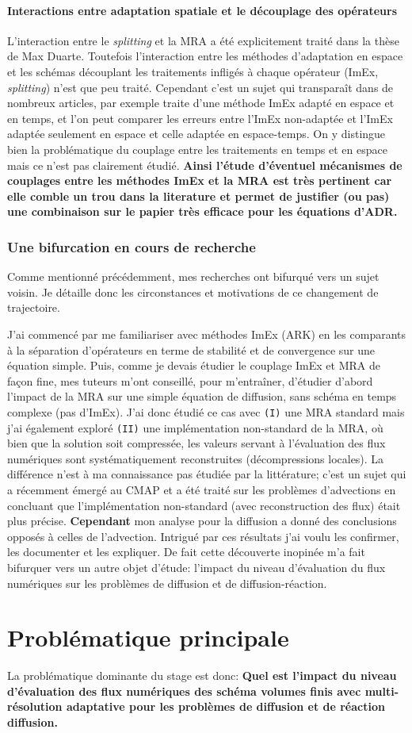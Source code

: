     \paragraph{Interactions entre adaptation spatiale et le découplage des opérateurs}
        L'interaction entre le \textit{splitting} et la MRA a été explicitement traité dans la thèse de Max Duarte.    
        Toutefois l'interaction entre les méthodes d'adaptation en espace et les schémas découplant les traitements infligés à chaque opérateur (ImEx, \textit{splitting}) n'est que peu traité.
        Cependant c'est un sujet qui transparaît dans de nombreux articles, par exemple \cite{Zhang2025IMEXTSA} traite d'une méthode ImEx adapté en espace et en temps, et l'on peut comparer les erreurs entre l'ImEx non-adaptée et 
        l'ImEx adaptée seulement en espace et celle adaptée en espace-temps. On y distingue bien la problématique du couplage entre les traitements en temps et en espace mais ce n'est pas clairement étudié.
        \textbf{Ainsi l'étude d'éventuel mécanismes de couplages entre les méthodes ImEx et la MRA est très pertinent car elle comble un trou dans la literature et permet de justifier (ou pas)
        une combinaison sur le papier très efficace pour les équations d'ADR.}
    \subsubsection{Une bifurcation en cours de recherche}
        Comme mentionné précédemment, mes recherches ont bifurqué vers un sujet voisin. Je détaille donc les circonstances et motivations de ce changement de trajectoire.\par 
        J'ai commencé par me familiariser avec méthodes ImEx (ARK) en les comparants à la séparation d'opérateurs en terme de stabilité et de convergence sur une équation simple.
        Puis, comme je devais étudier le couplage ImEx et MRA de façon fine, mes tuteurs m'ont conseillé, pour m’entraîner, 
        d'étudier d'abord l'impact de la MRA sur une simple équation de diffusion, sans schéma en temps complexe (pas d'ImEx).
        J'ai donc étudié ce cas avec \texttt{(I)} une MRA standard mais j'ai également exploré \texttt{(II)} une implémentation non-standard de la MRA, où bien que la solution soit compressée, 
        les valeurs servant à l'évaluation des flux numériques sont systématiquement reconstruites (décompressions locales).
        La différence n'est à ma connaissance pas étudiée par la littérature;
        c'est un sujet qui a récemment émergé au CMAP et a été traité sur les problèmes d’advections en \cite{belloti_et_al_2025} 
        concluant que l'implémentation non-standard (avec reconstruction des flux) était plus précise.
        \textbf{Cependant} mon analyse pour la diffusion a donné des conclusions opposés à celles de l'advection.
        Intrigué par ces résultats j'ai voulu les confirmer, les documenter et les expliquer.
        De fait cette découverte inopinée m'a fait bifurquer vers un autre objet d'étude: 
        l'impact du niveau d'évaluation du flux numériques sur les problèmes de diffusion et de diffusion-réaction.\par
    \newpage
    \section{Problématique principale}
    La problématique dominante du stage est donc: \textbf{Quel est l'impact du niveau d'évaluation des flux numériques des schéma volumes finis avec multi-résolution adaptative
    pour les problèmes de diffusion et de réaction diffusion.}